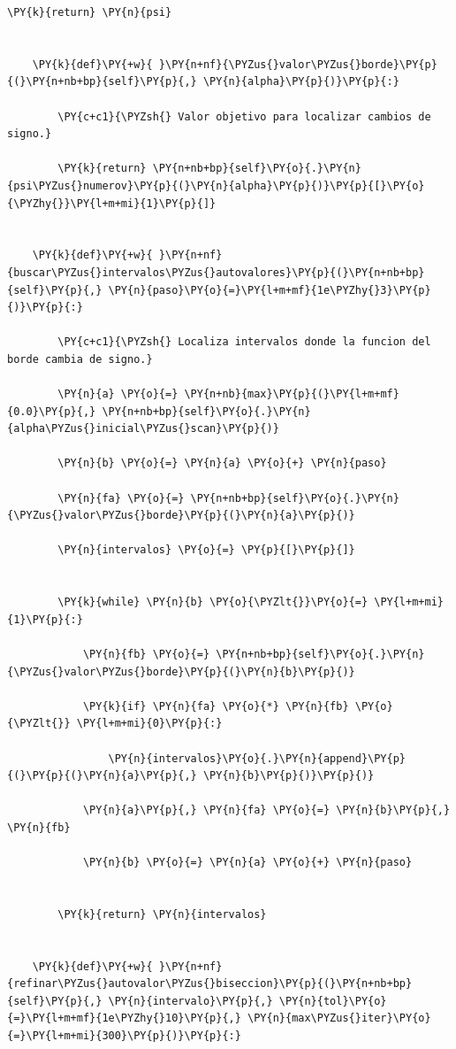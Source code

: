 \documentclass[11pt]{article}
\makeatletter
\def\PY@reset{\let\PY@it=\relax \let\PY@bf=\relax \let\PY@ul=\relax \let\PY@tc=\relax \let\PY@bc=\relax \let\PY@ff=\relax}
\def\PY@tok#1{\csname PY@tok@#1\endcsname}
\def\PY@toks#1+{\ifx\relax#1\empty\else \PY@tok{#1}\expandafter\PY@toks\fi}
\def\PY@do#1{\PY@bc{\PY@tc{\PY@ul{\PY@it{\PY@bf{\PY@ff{#1}}}}}}}
\def\PY#1#2{\PY@reset\PY@toks#1+\relax+\PY@do{#2}}
\makeatother
\begin{document}
\begin{tcolorbox}[breakable, size=fbox, boxrule=1pt, pad at break*=1mm,colback=cellbackground, colframe=cellborder]
\begin{Verbatim}[commandchars=\\\{\}]
        \PY{k}{return} \PY{n}{psi}


    \PY{k}{def}\PY{+w}{ }\PY{n+nf}{\PYZus{}valor\PYZus{}borde}\PY{p}{(}\PY{n+nb+bp}{self}\PY{p}{,} \PY{n}{alpha}\PY{p}{)}\PY{p}{:}

        \PY{c+c1}{\PYZsh{} Valor objetivo para localizar cambios de signo.}

        \PY{k}{return} \PY{n+nb+bp}{self}\PY{o}{.}\PY{n}{psi\PYZus{}numerov}\PY{p}{(}\PY{n}{alpha}\PY{p}{)}\PY{p}{[}\PY{o}{\PYZhy{}}\PY{l+m+mi}{1}\PY{p}{]}


    \PY{k}{def}\PY{+w}{ }\PY{n+nf}{buscar\PYZus{}intervalos\PYZus{}autovalores}\PY{p}{(}\PY{n+nb+bp}{self}\PY{p}{,} \PY{n}{paso}\PY{o}{=}\PY{l+m+mf}{1e\PYZhy{}3}\PY{p}{)}\PY{p}{:}

        \PY{c+c1}{\PYZsh{} Localiza intervalos donde la funcion del borde cambia de signo.}

        \PY{n}{a} \PY{o}{=} \PY{n+nb}{max}\PY{p}{(}\PY{l+m+mf}{0.0}\PY{p}{,} \PY{n+nb+bp}{self}\PY{o}{.}\PY{n}{alpha\PYZus{}inicial\PYZus{}scan}\PY{p}{)}

        \PY{n}{b} \PY{o}{=} \PY{n}{a} \PY{o}{+} \PY{n}{paso}

        \PY{n}{fa} \PY{o}{=} \PY{n+nb+bp}{self}\PY{o}{.}\PY{n}{\PYZus{}valor\PYZus{}borde}\PY{p}{(}\PY{n}{a}\PY{p}{)}

        \PY{n}{intervalos} \PY{o}{=} \PY{p}{[}\PY{p}{]}


        \PY{k}{while} \PY{n}{b} \PY{o}{\PYZlt{}}\PY{o}{=} \PY{l+m+mi}{1}\PY{p}{:}

            \PY{n}{fb} \PY{o}{=} \PY{n+nb+bp}{self}\PY{o}{.}\PY{n}{\PYZus{}valor\PYZus{}borde}\PY{p}{(}\PY{n}{b}\PY{p}{)}

            \PY{k}{if} \PY{n}{fa} \PY{o}{*} \PY{n}{fb} \PY{o}{\PYZlt{}} \PY{l+m+mi}{0}\PY{p}{:}

                \PY{n}{intervalos}\PY{o}{.}\PY{n}{append}\PY{p}{(}\PY{p}{(}\PY{n}{a}\PY{p}{,} \PY{n}{b}\PY{p}{)}\PY{p}{)}

            \PY{n}{a}\PY{p}{,} \PY{n}{fa} \PY{o}{=} \PY{n}{b}\PY{p}{,} \PY{n}{fb}

            \PY{n}{b} \PY{o}{=} \PY{n}{a} \PY{o}{+} \PY{n}{paso}


        \PY{k}{return} \PY{n}{intervalos}


    \PY{k}{def}\PY{+w}{ }\PY{n+nf}{refinar\PYZus{}autovalor\PYZus{}biseccion}\PY{p}{(}\PY{n+nb+bp}{self}\PY{p}{,} \PY{n}{intervalo}\PY{p}{,} \PY{n}{tol}\PY{o}{=}\PY{l+m+mf}{1e\PYZhy{}10}\PY{p}{,} \PY{n}{max\PYZus{}iter}\PY{o}{=}\PY{l+m+mi}{300}\PY{p}{)}\PY{p}{:}


\end{Verbatim}
\end{tcolorbox}
\end{document}
